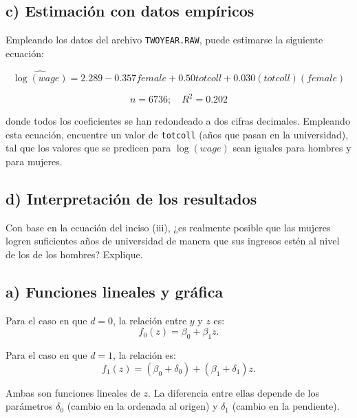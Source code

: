 \documentclass[12pt]{article}
\begin{document}
\subsection*{c) Estimación con datos empíricos}
Empleando los datos del archivo \texttt{TWOYEAR.RAW}, puede estimarse la siguiente ecuación:

\[
\widehat{\log(wage)} = 2.289 - 0.357female + 0.50totcoll + 0.030(totcoll)(female)
\]

\[
n = 6736; \quad R^{2} = 0.202
\]

donde todos los coeficientes se han redondeado a dos cifras decimales. Empleando esta ecuación, encuentre un valor de \texttt{totcoll} (años que pasan en la universidad), tal que los valores que se predicen para $\log(wage)$ sean iguales para hombres y para mujeres.

\subsection*{d) Interpretación de los resultados}
Con base en la ecuación del inciso (iii), ¿es realmente posible que las mujeres logren suficientes años de universidad de manera que sus ingresos estén al nivel de los de los hombres? Explique.

\subsection*{a) Funciones lineales y gráfica}

Para el caso en que $d=0$, la relación entre $y$ y $z$ es:
\[
f_{0}(z) = \beta_{0} + \beta_{1}z.
\]

Para el caso en que $d=1$, la relación es:
\[
f_{1}(z) = (\beta_{0} + \delta_{0}) + (\beta_{1} + \delta_{1})z.
\]

Ambas son funciones lineales de $z$. La diferencia entre ellas depende de los parámetros $\delta_{0}$ (cambio en la ordenada al origen) y $\delta_{1}$ (cambio en la pendiente).

\vspace{0.5cm}

\begin{center}
\end{center}
\end{document}
